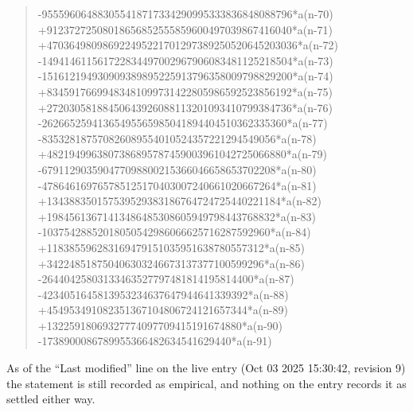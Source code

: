 \documentclass[11pt,a4paper]{article}
\theoremstyle{plain}
\theoremstyle{definition}
\begin{document}
\begin{quote}
-955596064883055418717334290995333836848088796*a(n-70) +91237272508018656852555859600497039867416040*a(n-71) +470364980986922495221701297389250520645203036*a(n-72) -149414611561722834497002967906083481125218504*a(n-73) -151612194930909389895225913796358009798829200*a(n-74) +83459176699483481099731422805986592523856192*a(n-75) +27203058188450643926088113201093410799384736*a(n-76) -26266525941365495565985041894404510362335360*a(n-77) -835328187570826089554010524357221294549056*a(n-78) +4821949963807386895787459003961042725066880*a(n-79) -679112903590477098800215366046658653702208*a(n-80) -478646169765785125170403007240661020667264*a(n-81) +134388350157539529383186764724725440221184*a(n-82) +19845613671413486485308605949798443768832*a(n-83) -10375428852018050542986066625716287592960*a(n-84) +118385596283169479151035951638780557312*a(n-85) +342248518750406303246673137377100599296*a(n-86) -26440425803133463527797481814195814400*a(n-87) -4234051645813953234637647944641339392*a(n-88) +454953491082351367104806724121657344*a(n-89) +13225918069327774097709415191674880*a(n-90) -1738900086789955366482634541629440*a(n-91)
\end{quote}
As of the ``Last modified'' line on the live entry (Oct 03 2025 15:30:42, revision 9) the statement is
still recorded as empirical, and nothing on the entry records it as settled either way.
\end{document}
